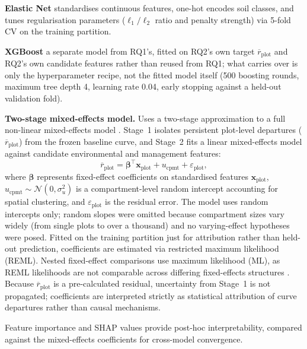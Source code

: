 \documentclass[11pt,a4paper]{report}
\begin{document}
\begin{enumerate*}[label=(\roman*)]
\item \textbf{Elastic Net} standardises continuous features, one-hot encodes soil classes, and tunes regularisation parameters ($\ell_1/\ell_2$ ratio and penalty strength) via 5-fold CV on the training partition.
\item \textbf{XGBoost} a separate model from RQ1's, fitted on RQ2's own target
  $\overline{r}_{\text{plot}}$ and RQ2's own candidate features rather than reused from RQ1;
  what carries over is only the hyperparameter recipe, not the fitted model itself (500 boosting
  rounds, maximum tree depth 4, learning rate 0.04, early stopping against a held-out validation fold).
\item \textbf{Two-stage mixed-effects model.} Uses a two-stage approximation to a full non-linear mixed-effects model \citep{socha2016Assessment_C2_CR}. Stage~1 isolates persistent plot-level departures ($\overline{r}_{\text{plot}}$) from the frozen baseline curve, and Stage~2 fits a linear mixed-effects model against candidate environmental and management features:
\begin{equation}
\overline{r}_{\text{plot}} = \boldsymbol{\beta}^{\top}\mathbf{x}_{\text{plot}} + u_{\text{cpmt}} + \varepsilon_{\text{plot}},
\label{eq:mixed-effects}
\end{equation}
where $\boldsymbol{\beta}$ represents fixed-effect coefficients on standardised features $\mathbf{x}_{\text{plot}}$, $u_{\text{cpmt}} \sim \mathcal{N}(0, \sigma_u^2)$ is a compartment-level random intercept accounting for spatial clustering, and $\varepsilon_{\text{plot}}$ is the residual error. The model uses random intercepts only; random slopes were omitted because compartment sizes vary widely (from single plots to over a thousand) and no varying-effect hypotheses were posed. Fitted on the training partition just for attribution rather than held-out prediction, coefficients are estimated via restricted maximum likelihood (REML). Nested fixed-effect comparisons use maximum likelihood (ML), as REML likelihoods are not comparable across differing fixed-effects structures \citep{pinheiro2000Mixed_C5_EVAL}. Because $\overline{r}_{\text{plot}}$ is a pre-calculated residual, uncertainty from Stage~1 is not propagated; coefficients are interpreted strictly as statistical attribution of curve departures rather than causal mechanisms.
\end{enumerate*}

Feature importance and SHAP values provide post-hoc interpretability, compared against the mixed-effects coefficients for cross-model convergence.
\end{document}

